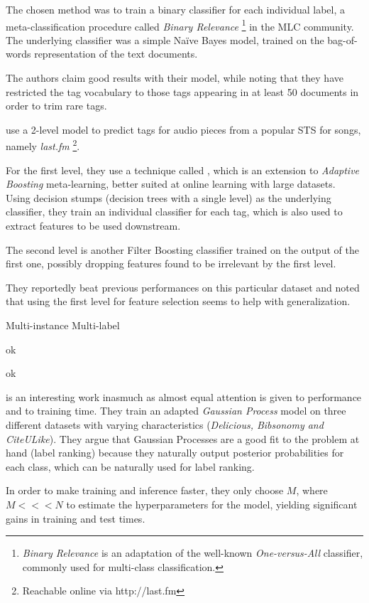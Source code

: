 The chosen method was to train a binary classifier for each individual label, a meta-classification procedure called \textit{Binary Relevance} \footnote{\textit{Binary Relevance} is an adaptation of the well-known \textit{One-versus-All} \citep{rifkin_klautau_2004} classifier, commonly used for multi-class classification.} in the MLC community. The underlying classifier was a simple Naïve Bayes model, trained on the bag-of-words representation of the text documents.

The authors claim good results with their model, while noting that they have restricted the tag vocabulary to those tags appearing in at least 50 documents in order to trim rare tags.

\cite{bertin-mahieux_etal_2008} use a 2-level model to predict tags for audio pieces from a popular STS for songs, namely \textit{last.fm} \footnote{Reachable online via http://last.fm}.

For the first level, they use a technique called \citet{Filter Boosting}, which is an extension to \textit{Adaptive Boosting} meta-learning, better suited at online learning with large datasets. Using decision stumps (decision trees with a single level) as the underlying classifier, they train an individual classifier for each tag, which is also used to extract features to be used downstream.

The second level is another Filter Boosting classifier trained on the output of the first one, possibly dropping features found to be irrelevant by the first level.

They reportedly beat previous performances on this particular dataset and noted that using the first level for feature selection seems to help with generalization.

\cite{shen_etal_2009} Multi-instance Multi-label

ok

\cite{illig_etal_2011}

ok

\cite{song_etal_2011} is an interesting work inasmuch as almost equal attention is given to performance and to training time. They train an adapted \textit{Gaussian Process} model on three different datasets with varying characteristics (\textit{Delicious, Bibsonomy and CiteULike}). They argue that Gaussian Processes are a good fit to the problem at hand (label ranking) because they naturally output posterior probabilities for each class, which can be naturally used for label ranking.

In order to make training and inference faster, they only choose $M$, where $M <<< N$ to estimate the hyperparameters for the model, yielding significant gains in training and test times.

